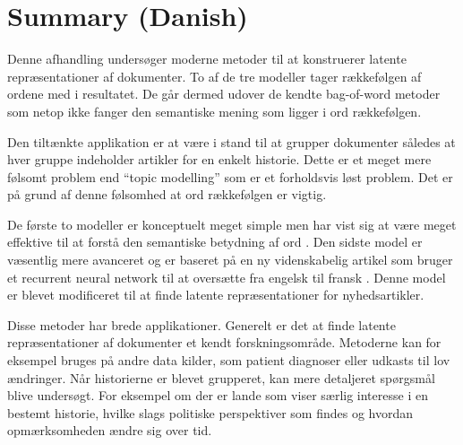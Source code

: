 \chapter{Summary (Danish)}

Denne afhandling undersøger moderne metoder til at konstruerer latente repræsentationer af dokumenter. To af de tre modeller tager rækkefølgen af ordene med i resultatet. De går dermed udover de kendte bag-of-word metoder som netop ikke fanger den semantiske mening som ligger i ord rækkefølgen. 

Den tiltænkte applikation er at være i stand til at grupper dokumenter således at hver gruppe indeholder artikler for en enkelt historie. Dette er et meget mere følsomt problem end ``topic modelling'' som er et forholdsvis løst problem. Det er på grund af denne følsomhed at ord rækkefølgen er vigtig.

De første to modeller er konceptuelt meget simple men har vist sig at være meget effektive til at forstå den semantiske betydning af ord \cite{word2vec-details, doc2vec}. Den sidste model er væsentlig mere avanceret og er baseret på en ny videnskabelig artikel som bruger et recurrent neural network til at oversætte fra engelsk til fransk \cite{sutskever}. Denne model er blevet modificeret til at finde latente repræsentationer for nyhedsartikler.

Disse metoder har brede applikationer. Generelt er det at finde latente repræsentationer af dokumenter et kendt forskningsområde. Metoderne kan for eksempel bruges på andre data kilder, som patient diagnoser eller udkasts til lov ændringer.
Når historierne er blevet grupperet, kan mere detaljeret spørgsmål blive undersøgt. For eksempel om der er lande som viser særlig interesse i en bestemt historie, hvilke slags politiske perspektiver som findes og hvordan opmærksomheden ændre sig over tid.
